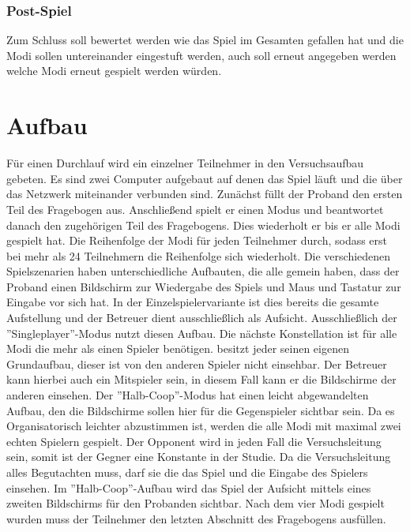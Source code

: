 \subsubsection{Post-Spiel}
Zum Schluss soll bewertet werden wie das Spiel im Gesamten gefallen hat und die Modi sollen untereinander eingestuft werden, auch soll erneut angegeben werden welche Modi erneut gespielt werden würden.

\section{Aufbau}\label{sec:Aufbau}
Für einen Durchlauf wird ein einzelner Teilnehmer in den Versuchsaufbau gebeten. Es sind zwei Computer aufgebaut auf denen das Spiel läuft und die über das Netzwerk miteinander verbunden sind. Zunächst füllt der Proband den ersten Teil des Fragebogen aus. Anschließend spielt er einen Modus und beantwortet danach den zugehörigen Teil des Fragebogens. Dies wiederholt er bis er alle Modi gespielt hat. Die Reihenfolge der Modi für jeden Teilnehmer durch, sodass erst bei mehr als 24 Teilnehmern die Reihenfolge sich wiederholt. Die verschiedenen Spielszenarien haben unterschiedliche Aufbauten, die alle gemein haben, dass der Proband einen Bildschirm zur Wiedergabe des Spiels und Maus und Tastatur zur Eingabe vor sich hat. In der Einzelspielervariante ist dies bereits die gesamte Aufstellung und der Betreuer dient ausschließlich als Aufsicht. Ausschließlich der ''Singleplayer''-Modus nutzt diesen Aufbau. Die nächste Konstellation ist für alle Modi die mehr als einen Spieler benötigen. besitzt jeder seinen eigenen Grundaufbau, dieser ist von den anderen Spieler nicht einsehbar. Der Betreuer kann hierbei auch ein Mitspieler sein, in diesem Fall kann er die Bildschirme der anderen einsehen. Der ''Halb-Coop''-Modus hat einen leicht abgewandelten Aufbau, den die Bildschirme sollen hier für die Gegenspieler sichtbar sein. Da es Organisatorisch leichter abzustimmen ist, werden die alle Modi mit maximal zwei echten Spielern gespielt. Der Opponent wird in jeden Fall die Versuchsleitung sein, somit ist der Gegner eine Konstante in der Studie. Da die Versuchsleitung alles Begutachten muss, darf sie die das Spiel und die Eingabe des Spielers einsehen. Im ''Halb-Coop''-Aufbau wird das Spiel der Aufsicht mittels eines zweiten Bildschirms für den Probanden sichtbar. Nach dem vier Modi gespielt wurden muss der Teilnehmer den letzten Abschnitt des Fragebogens ausfüllen.

